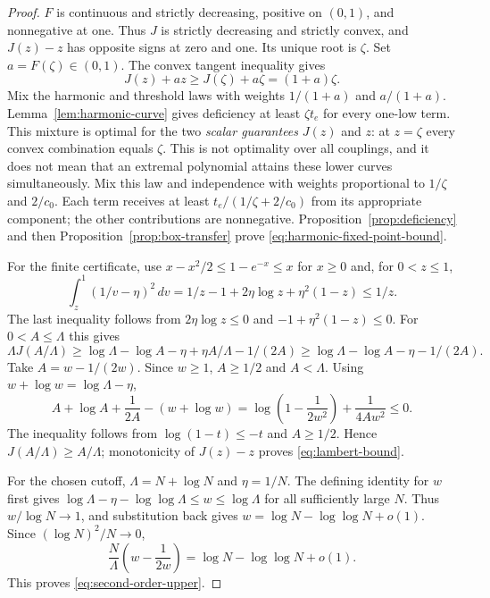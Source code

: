 \begin{proof}
$F$ is continuous and strictly decreasing, positive on $(0,1)$, and
nonnegative at one. Thus $J$ is strictly decreasing and strictly convex,
and $J(z)-z$ has opposite signs at zero and one. Its unique root is
$\zeta$. Set $a=F(\zeta)\in(0,1)$. The convex tangent inequality gives
\[
 J(z)+az\ge J(\zeta)+a\zeta=(1+a)\zeta.
\]
Mix the harmonic and threshold laws with weights $1/(1+a)$ and
$a/(1+a)$. Lemma~\ref{lem:harmonic-curve} gives deficiency at least
$\zeta t_e$ for every one-low term. This mixture is optimal for the two
\emph{scalar guarantees} $J(z)$ and
$z$: at $z=\zeta$ every convex combination equals $\zeta$. This is not
optimality over all couplings, and it does not mean that an extremal
polynomial attains these lower curves simultaneously. Mix this law and
independence with weights
proportional to $1/\zeta$ and $2/c_0$. Each term receives at least
$t_e/(1/\zeta+2/c_0)$ from its appropriate component; the other
contributions are nonnegative. Proposition~\ref{prop:deficiency} and
then Proposition~\ref{prop:box-transfer} prove
\eqref{eq:harmonic-fixed-point-bound}.

For the finite certificate, use $x-x^2/2\le1-e^{-x}\le x$ for $x\ge0$
and, for $0<z\le1$,
\[
 \int_z^1(1/v-\eta)^2\,dv
 =1/z-1+2\eta\log z+\eta^2(1-z)\le1/z.
\]
The last inequality follows from $2\eta\log z\le0$ and
$-1+\eta^2(1-z)\le0$. For $0<A\le\Lambda$ this gives
\begin{equation}\label{eq:lambert-integral-certificate}
 \Lambda J(A/\Lambda)
 \ge\log\Lambda-\log A-\eta+\eta A/\Lambda-1/(2A)
 \ge\log\Lambda-\log A-\eta-1/(2A).
\end{equation}
Take $A=w-1/(2w)$. Since $w\ge1$, $A\ge1/2$ and $A<\Lambda$.
Using $w+\log w=\log\Lambda-\eta$,
\[
 A+\log A+\frac1{2A}-(w+\log w)
 =\log\left(1-\frac1{2w^2}\right)+\frac1{4Aw^2}\le0.
\]
The inequality follows from $\log(1-t)\le-t$ and $A\ge1/2$.
Hence $J(A/\Lambda)\ge A/\Lambda$; monotonicity of $J(z)-z$ proves
\eqref{eq:lambert-bound}.

For the chosen cutoff, $\Lambda=N+\log N$ and $\eta=1/N$. The defining
identity for $w$ first gives
$\log\Lambda-\eta-\log\log\Lambda\le w\le\log\Lambda$
for all sufficiently large $N$. Thus $w/\log N\to1$, and substitution
back gives $w=\log N-\log\log N+o(1)$. Since
$(\log N)^2/N\to0$,
\[
 \frac{N}{\Lambda}\left(w-\frac1{2w}\right)
 =\log N-\log\log N+o(1).
\]
This proves \eqref{eq:second-order-upper}.
\end{proof}

